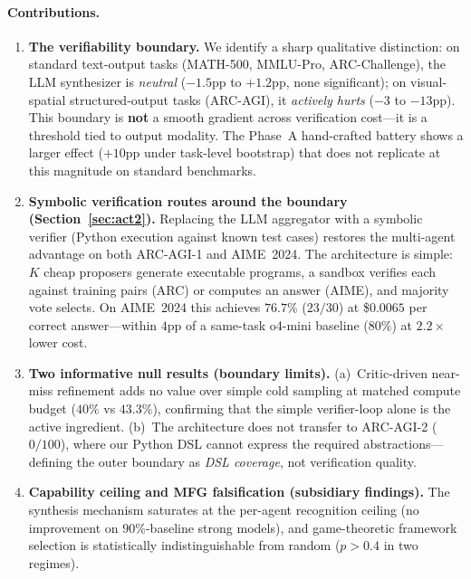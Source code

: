 \documentclass[11pt]{amsart}
\newcommand\1{{\mathds{1}}}
\theoremstyle{definition}
\theoremstyle{remark}
\numberwithin{equation}{section}
\begin{document}
\paragraph{Contributions.}
\begin{enumerate}[leftmargin=1.2em, itemsep=2pt]
\item \textbf{The verifiability boundary.}
We identify a sharp qualitative distinction: on standard text-output tasks (MATH-500, MMLU-Pro, ARC-Challenge), the LLM synthesizer is \emph{neutral} ($-1.5$pp to $+1.2$pp, none significant); on visual-spatial structured-output tasks (ARC-AGI), it \emph{actively hurts} ($-3$ to $-13$pp).
This boundary is \textbf{not} a smooth gradient across verification cost---it is a threshold tied to output modality.
The Phase~A hand-crafted battery shows a larger effect ($+10$pp under task-level bootstrap) that does not replicate at this magnitude on standard benchmarks.
\item \textbf{Symbolic verification routes around the boundary (Section~\ref{sec:act2}).}
Replacing the LLM aggregator with a symbolic verifier (Python execution against known test cases) restores the multi-agent advantage on both ARC-AGI-1 and AIME~2024.
The architecture is simple: $K$ cheap proposers generate executable programs, a sandbox verifies each against training pairs (ARC) or computes an answer (AIME), and majority vote selects.
On AIME~2024 this achieves $76.7\%$ ($23/30$) at \$$0.0065$ per correct answer---within $4$pp of a same-task o4-mini baseline ($80\%$) at $2.2\times$ lower cost.
\item \textbf{Two informative null results (boundary limits).}
(a)~Critic-driven near-miss refinement adds no value over simple cold sampling at matched compute budget ($40\%$ vs $43.3\%$), confirming that the simple verifier-loop alone is the active ingredient.
(b)~The architecture does not transfer to ARC-AGI-2 ($0/100$), where our Python DSL cannot express the required abstractions---defining the outer boundary as \emph{DSL coverage}, not verification quality.
\item \textbf{Capability ceiling and MFG falsification (subsidiary findings).}
The synthesis mechanism saturates at the per-agent recognition ceiling (no improvement on $90\%$-baseline strong models), and game-theoretic framework selection is statistically indistinguishable from random ($p > 0.4$ in two regimes).
\end{enumerate}
\end{document}
